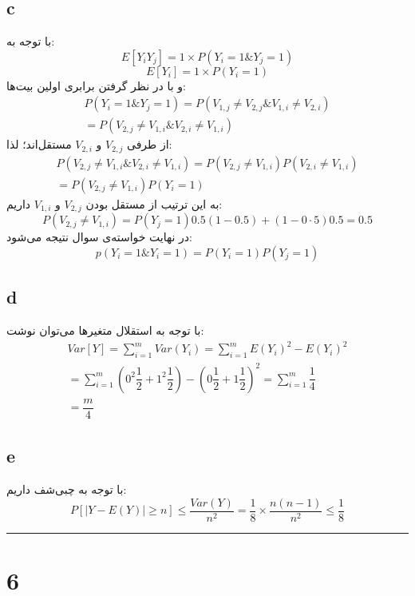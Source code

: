 \documentclass{article}
\begin{document}
\subsection*{c}
با توجه به:
$$E\left[ Y_{i}Y_{j}\right] =1\times P\left( Y_{i}=1\& Y_{j}=1\right)$$
$$E\left[ Y_{i}\right] =1\times P\left( Y_{i}=1\right)$$
و با در نظر گرفتن برابری اولین بیت‌ها:
$$\begin{aligned}P\left( Y_{i}=1\& Y_{j}=1\right) =P\left( V_{1,j}\neq V_{2,j}\& V_{1,i}\neq V_{2,i}\right) \\ =P\left( V_{2,j}\neq V_{1,i}\& V_{2,i}\neq V_{1,i}\right) \end{aligned}$$
از طرفی
$V_{2,j}$
و
$V_{2,i}$
مستقل‌اند؛ لذا:
$$\begin{aligned}P\left( V_{2,j}\neq V_{1,i}\& V_{2,i}\neq V_{1,i}\right) =P\left( V_{2,j}\neq V_{1,i}\right) P\left( V_{2,i}\neq V_{1,i}\right) \\ =P\left( V_{2,j}\neq V_{1,i}\right) P\left( Y_{i}=1\right) \end{aligned}$$
به این ترتیب از مستقل بودن
$V_{2,j}$
و
$V_{1,i}$
داریم:
$$P( V_{2,j}\neq V_{1,i}) = P(Y_j = 1) 0.5\left( 1-0.5\right) +\left( 1-0\cdot 5\right) 0.5=0.5$$
در نهایت خواسته‌ی سوال نتیجه می‌شود:
$$p( Y_{i}=1\& Y_{i}= 1) =P( Y_{i}= 1) P( Y_{j}= 1)$$

\subsection*{d}
با توجه به استقلال متغیرها می‌توان نوشت:
$$\begin{aligned}Var\left[ Y\right] =\sum ^{m}_{i=1}Var\left( Y_{i}\right) =\sum ^{m}_{i=1}E\left( Y_{i}\right) ^{2}-E\left( Y_{i}\right) ^{2}\\ =\sum ^{m}_{i=1}\left( 0^{2}\dfrac{1}{2}+1^{2}\dfrac{1}{2}\right) -\left( 0\dfrac{1}{2}+1\dfrac{1}{2}\right) ^{2}=\sum ^{m}_{i=1}\dfrac{1}{4}\\ =\dfrac{m}{4}\end{aligned}$$

\subsection*{e}
با توجه به چبی‌شف داریم:
$$P[ \left| Y-E\left( Y\right) \right| \geq n] \leq \dfrac{Var\left( Y\right) }{n^{2}}=\dfrac{1}{8}\times \dfrac{n\left( n-1\right) }{n^{2}}\leq \dfrac{1}{8}$$

\rule{\linewidth}{1pt}

\section*{6}
\end{document}
